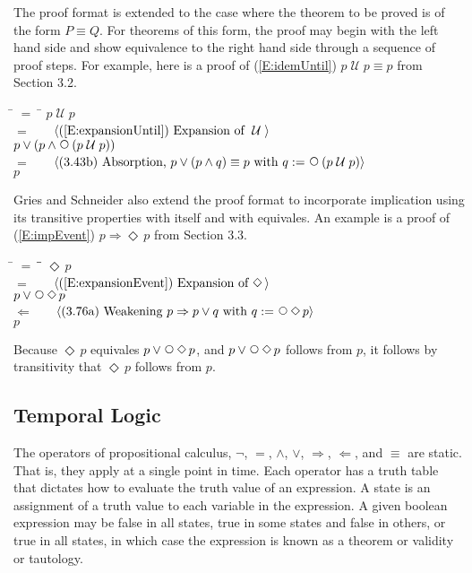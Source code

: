 \documentclass[fleqn, leqno]{article}
\newcommand{\lgap}{2pt}                             %
\newcommand{\mymathindent}{24pt}                    %
\newcommand{\impl}{\ensuremath{\Rightarrow}}        %
\newcommand{\foll}{\ensuremath{\Leftarrow}}         %
\newcommand{\Until}{\;\mathcal{U}\;}
\newcommand{\Next}{\;\,\text{\raisebox{3.5pt}{\circle{6}}}}
\newcommand{\Event}{\Diamond\,}
\newcommand{\myqedtab}{\hspace{388.5pt}}              %
\newcommand{\Gll} {\langle}                         %
\newcommand{\Ggg} {\rangle}                         %
\newcommand{\Hint}[1]     {\ \ \ $\Gll              \mbox{#1} \Ggg$ }   %
\begin{document}
The proof format is extended to the case where the theorem to be proved is of the form $P \equiv Q$.
For theorems of this form, the proof may begin with the left hand side and show equivalence to the right hand side
through a sequence of proof steps.
For example, here is a proof of (\ref{E:idemUntil}) $p \Until p \equiv p$ from Section 3.2.

\begin{tabbing}
\hspace{\mymathindent} \= $= \;$ \= \kill
  \> \>   $p \Until p$\\[\lgap]
  \> $=$  \>  \Hint{(\ref{E:expansionUntil}) Expansion of $\Until$}\\[\lgap]
  \> \>   $p \lor (p \land \Next(p \Until p))$\\[\lgap]
  \> $=$  \>  \Hint{(3.43b) Absorption, $p \lor (p \land q) \equiv p$ with $q := \Next (p \Until p)$}\\[\lgap]
  \> \>   $p$
\end{tabbing}

Gries and Schneider \cite{LADM} also extend the proof format to incorporate implication using its transitive properties
with itself and with equivales.
An example is a proof of (\ref{E:impEvent}) $p \impl \Event p$ from Section 3.3.

\begin{tabbing}
\hspace{\mymathindent} \= $= \;$ \= \myqedtab \= \kill
  \> \>   $\Event p$\\[\lgap]
  \> $=$  \>  \Hint{(\ref{E:expansionEvent}) Expansion of $\Event$}\\[\lgap]
  \> \>   $p \lor \Next\Event p$\\[\lgap]
  \> $\foll$  \>  \Hint{(3.76a) Weakening $p\impl p\lor q$ with $q:=\Next\Event p$}\\[\lgap]
  \> \>   $p$
\end{tabbing}

Because $\Event p$ equivales $p \lor \Next\Event p$, and $p \lor \Next\Event p$ follows from $p$, it follows by
transitivity that $\Event p$ follows from $p$.

\subsection{Temporal Logic}

The operators of propositional calculus, $\neg$, $=$, $\land$, $\lor$, $\impl$, $\foll$, and $\equiv$ are static.
That is, they apply at a single point in time.
Each operator has a truth table that dictates how to evaluate the truth value of an expression.
A state is an assignment of a truth value to each variable in the expression.
A given boolean expression may be false in all states, true in some states and false in others, or true in all states, in which case the expression is known as a theorem or validity or tautology.\\
\end{document}
